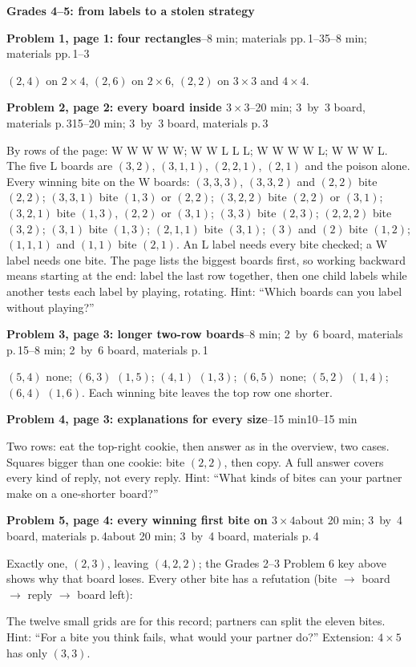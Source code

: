 \documentclass[11pt]{article}
\newcommand{\head}[1]{\par\textbf{\large #1}\par}
\newcommand{\sub}[2][]{\par\textbf{#2}\ifx\relax#1\relax\else\hfill{\small #1}\fi\par}
\newcommand{\mat}[1]{materials p.\,#1}
\newcommand{\pos}[1]{$(#1)$}
\begin{document}
\head{Grades 4--5: from labels to a stolen strategy}
\sub[5--8 min; materials pp.\,1--3]{Problem 1, page 1: four rectangles}
$(2,4)$ on $2\times4$, $(2,6)$ on $2\times6$, $(2,2)$ on $3\times3$ and $4\times4$.

\sub[15--20 min; 3~by~3 board, \mat{3}]{Problem 2, page 2: every board inside $3\times3$}
By rows of the page: W W W W W; W W L L L; W W W W L; W W W L. The five L boards are \pos{3,2}, \pos{3,1,1}, \pos{2,2,1}, \pos{2,1} and the poison alone. Every winning bite on the W boards: \pos{3,3,3}, \pos{3,3,2} and \pos{2,2} bite $(2,2)$; \pos{3,3,1} bite $(1,3)$ or $(2,2)$; \pos{3,2,2} bite $(2,2)$ or $(3,1)$; \pos{3,2,1} bite $(1,3)$, $(2,2)$ or $(3,1)$; \pos{3,3} bite $(2,3)$; \pos{2,2,2} bite $(3,2)$; \pos{3,1} bite $(1,3)$; \pos{2,1,1} bite $(3,1)$; \pos{3} and \pos{2} bite $(1,2)$; \pos{1,1,1} and \pos{1,1} bite $(2,1)$. An L label needs every bite checked; a W label needs one bite. The page lists the biggest boards first, so working backward means starting at the end: label the last row together, then one child labels while another tests each label by playing, rotating. Hint: ``Which boards can you label without playing?''

\sub[5--8 min; 2~by~6 board, \mat{1}]{Problem 3, page 3: longer two-row boards}
\pos{5,4} none; \pos{6,3} $(1,5)$; \pos{4,1} $(1,3)$; \pos{6,5} none; \pos{5,2} $(1,4)$; \pos{6,4} $(1,6)$. Each winning bite leaves the top row one shorter.

\sub[10--15 min]{Problem 4, page 3: explanations for every size}
Two rows: eat the top-right cookie, then answer as in the overview, two cases. Squares bigger than one cookie: bite $(2,2)$, then copy. A full answer covers every kind of reply, not every reply. Hint: ``What kinds of bites can your partner make on a one-shorter board?''

\sub[about 20 min; 3~by~4 board, \mat{4}]{Problem 5, page 4: every winning first bite on $3\times4$}
Exactly one, $(2,3)$, leaving \pos{4,2,2}; the Grades 2--3 Problem 6 key above shows why that board loses. Every other bite has a refutation (bite $\to$ board $\to$ reply $\to$ board left):
\par{}
The twelve small grids are for this record; partners can split the eleven bites. Hint: ``For a bite you think fails, what would your partner do?'' Extension: $4\times5$ has only $(3,3)$.
\end{document}
